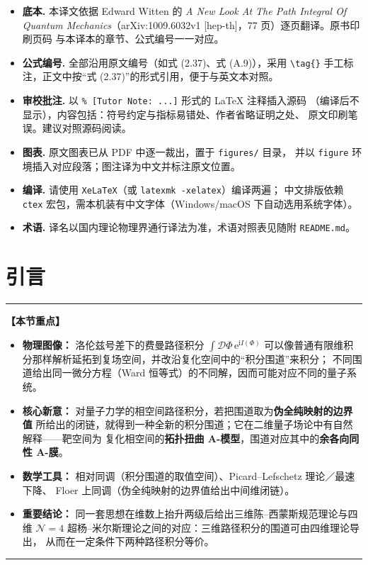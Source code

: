 \documentclass[11pt,a4paper,UTF8]{ctexart}
\theoremstyle{plain}
\theoremstyle{definition}
\newenvironment{keypoints}{%
  \par\addvspace{0.9em}%
  \noindent\begin{minipage}{\linewidth}%
  \color{black!80}\rule{\linewidth}{0.6pt}\par\vspace{2pt}%
  \noindent\textbf{【本节重点】}\par\vspace{2pt}%
  \begin{itemize}[leftmargin=1.6em,itemsep=1pt,topsep=2pt,parsep=0pt]%
}{%
  \end{itemize}\vspace{1pt}\noindent\color{black!80}\rule{\linewidth}{0.6pt}%
  \end{minipage}\par\addvspace{0.9em}%
}
\newcommand{\ee}{\mathrm{e}}
\newcommand{\ii}{\mathrm{i}}
\begin{document}
\begin{itemize}[leftmargin=1.6em,itemsep=2pt]
  \item \textbf{底本.} 本译文依据 Edward Witten 的 \emph{A New Look At The Path Integral
        Of Quantum Mechanics}（arXiv:1009.6032v1 [hep-th]，77 页）逐页翻译。原书印刷页码
        与本译本的章节、公式编号一一对应。
  \item \textbf{公式编号.} 全部沿用原文编号（如式 (2.37)、式 (A.9)），采用 \verb|\tag{}|
        手工标注，正文中按“式 (2.37)”的形式引用，便于与英文本对照。
  \item \textbf{审校批注.} 以 \verb|% [Tutor Note: ...]| 形式的 \LaTeX{} 注释插入源码
        （编译后不显示），内容包括：符号约定与指标易错处、作者省略证明之处、
        原文印刷笔误。建议对照源码阅读。
  \item \textbf{图表.} 原文图表已从 PDF 中逐一裁出，置于 \verb|figures/| 目录，
        并以 \verb|figure| 环境插入对应段落；图注译为中文并标注原文位置。
  \item \textbf{编译.} 请使用 \texttt{XeLaTeX}（或 \verb|latexmk -xelatex|）编译两遍；
        中文排版依赖 \verb|ctex| 宏包，需本机装有中文字体（Windows/macOS 下自动选用系统字体）。
  \item \textbf{术语.} 译名以国内理论物理界通行译法为准，术语对照表见随附
        \verb|README.md|。
\end{itemize}

\tableofcontents
\newpage



\section{引言}
\label{sec:intro}

\begin{keypoints}
  \item \textbf{物理图像：} 洛伦兹号差下的费曼路径积分 $\int\mathcal{D}\Phi\,\ee^{\ii I(\Phi)}$
        可以像普通有限维积分那样解析延拓到复场空间，并改沿复化空间中的“积分围道”来积分；
        不同围道给出同一微分方程（Ward 恒等式）的不同解，因而可能对应不同的量子系统。
  \item \textbf{核心新意：} 对量子力学的相空间路径积分，若把围道取为\textbf{伪全纯映射的边界值}
        所给出的闭链，就得到一种全新的积分围道；它在二维量子场论中有自然解释——靶空间为
        复化相空间的\textbf{拓扑扭曲 A-模型}，围道对应其中的\textbf{余各向同性 A-膜}。
  \item \textbf{数学工具：} 相对同调（积分围道的取值空间）、Picard--Lefschetz 理论／最速下降、
        Floer 上同调（伪全纯映射的边界值给出中间维闭链）。
  \item \textbf{重要结论：} 同一套思想在维数上抬升两级后给出三维陈--西蒙斯规范理论与四维
        $\mathcal{N}=4$ 超杨--米尔斯理论之间的对应：三维路径积分的围道可由四维理论导出，
        从而在一定条件下两种路径积分等价。
\end{keypoints}
\end{document}
